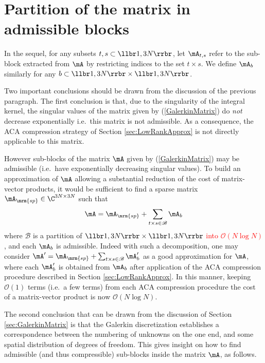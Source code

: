 


\section{Partition of the matrix in admissible blocks}
\label{section:partition}

In the sequel, for any subsets $t,s\subset \llbr1,3N\rrbr$, let $\mA_{t,s}$ refer to the sub-block extracted from $\mA$ 
by restricting indices to the set $t\times s$. We define $\mA_{b}$ similarly for any $b\subset \llbr 1,3N\rrbr\times \llbr 1,3N\rrbr$.

\bigskip
Two important conclusions should be drawn from the discussion of the previous paragraph. The first 
conclusion is that, due to the singularity of the integral kernel, the singular values of the matrix given 
by (\ref{GalerkinMatrix}) do \textit{not} decrease exponentially i.e.~this matrix is not admissible. 
As a consequence, the ACA compression strategy of Section \ref{sec:LowRankApprox} is not directly applicable 
to this matrix. 

\bigskip
However sub-blocks of the matrix $\mA$ given by (\ref{GalerkinMatrix}) may be admissible (i.e.~have exponentially 
decreasing singular values). To build an approximation of $\mA$ allowing a substantial reduction of the cost of 
matrix-vector products, it would be sufficient to find a sparse matrix $\mA_{\mrm{sp}}\in \C^{3N\times 3N}$ such that 
$$
\mA = \mA_{\mrm{sp}} + \sum_{t\times s\in \mathscr{B}} \mA_{b}
$$
where $\mathscr{B}$ is a partition of $\llbr 1,3N\rrbr\times \llbr 1,3N\rrbr$ \textcolor{red}{into $\mathcal{O}(N\log N)$}, and each 
$\mA_{b}$ is admissible. Indeed with such a decomposition, one may consider $\mA' = \mA_{\mrm{sp}} + \sum_{t\times s\in \mathscr{B}} \mA_{b}'$
as a good approximation for $\mA$, where each $\mA_{b}'$ is obtained from $\mA_{b}$ after application of the ACA compression 
procedure described in Section \ref{sec:LowRankApprox}. In this manner, keeping $\mathcal{O}(1)$ terms (i.e.~a few terms) from each 
ACA compression procedure the cost of a matrix-vector product is now $\mathcal{O}(N\log N)$.


\bigskip
The second conclusion that can be drawn from the discussion of Section \ref{sec:GalerkinMatrix} is that the Galerkin discretization establishes 
a correspondence between the numbering of unknowns on the one end, and some spatial distribution of degrees of freedom. This gives insight 
on how to find admissible (and thus compressible) sub-blocks inside the matrix $\mA$, as follows.

